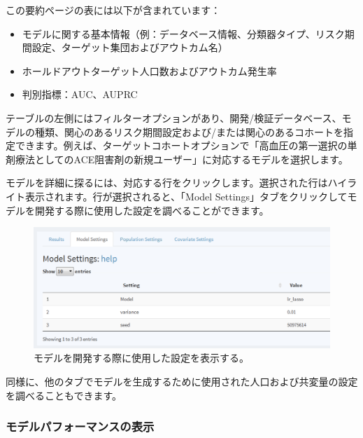 \documentclass[
  11pt]{book}
\providecommand{\tightlist}{%
  \setlength{\itemsep}{0pt}\setlength{\parskip}{0pt}}
\theoremstyle{definition}
\theoremstyle{definition}
\theoremstyle{definition}
\theoremstyle{definition}
\theoremstyle{remark}
\begin{document}
この要約ページの表には以下が含まれています：

\begin{itemize}
\tightlist
\item
  モデルに関する基本情報（例：データベース情報、分類器タイプ、リスク期間設定、ターゲット集団およびアウトカム名）
\item
  ホールドアウトターゲット人口数およびアウトカム発生率
\item
  判別指標：AUC、AUPRC
\end{itemize}

テーブルの左側にはフィルターオプションがあり、開発/検証データベース、モデルの種類、関心のあるリスク期間設定および/または関心のあるコホートを指定できます。例えば、ターゲットコホートオプションで「高血圧の第一選択の単剤療法としてのACE阻害剤の新規ユーザー」に対応するモデルを選択します。

モデルを詳細に探るには、対応する行をクリックします。選択された行はハイライト表示されます。行が選択されると、「Model Settings」タブをクリックしてモデルを開発する際に使用した設定を調べることができます。

\begin{figure}

{\centering \includegraphics[width=1\linewidth]{images/PatientLevelPrediction/shiny/shinyModel} 

}

\caption{モデルを開発する際に使用した設定を表示する。}\label{fig:shinyModel}
\end{figure}

同様に、他のタブでモデルを生成するために使用された人口および共変量の設定を調べることもできます。

\subsubsection*{モデルパフォーマンスの表示}\label{ux30e2ux30c7ux30ebux30d1ux30d5ux30a9ux30fcux30deux30f3ux30b9ux306eux8868ux793a}
\end{document}
